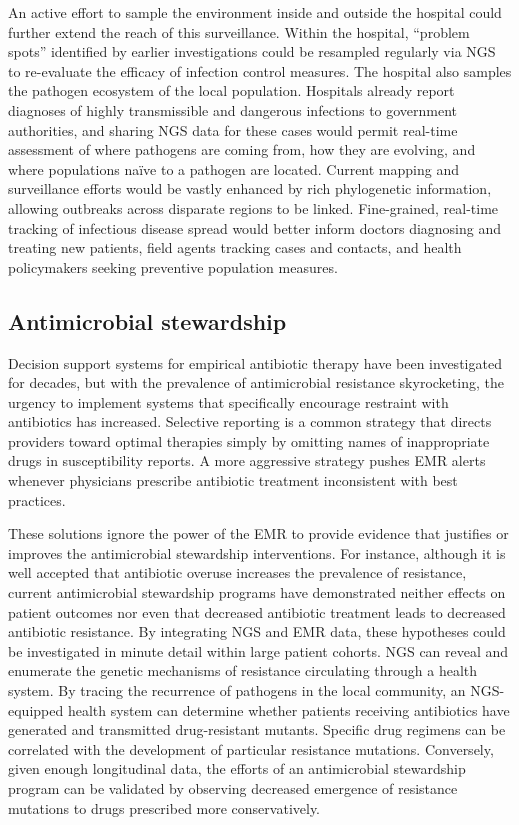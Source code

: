 An active effort to sample the environment inside and outside the hospital could further extend the reach of this surveillance. Within the hospital, “problem spots” identified by earlier investigations could be resampled regularly via NGS to re-evaluate the efficacy of infection control measures. The hospital also samples the pathogen ecosystem of the local population. Hospitals already report diagnoses of highly transmissible and dangerous infections to government authorities, and sharing NGS data for these cases would permit real-time assessment of where pathogens are coming from, how they are evolving, and where populations naïve to a pathogen are located. Current mapping and surveillance efforts \autocite{Brownstein2008} would be vastly enhanced by rich phylogenetic information, allowing outbreaks across disparate regions to be linked.\autocite{Chin2011,McAdam2012,Rasko2011} Fine-grained, real-time tracking of infectious disease spread would better inform doctors diagnosing and treating new patients, field agents tracking cases and contacts, and health policymakers seeking preventive population measures.

\subsection{Antimicrobial stewardship}

Decision support systems for empirical antibiotic therapy have been investigated for decades,\autocite{Leibovici1997} but with the prevalence of antimicrobial resistance skyrocketing, the urgency to implement systems that specifically encourage restraint with antibiotics has increased.\autocite{Wagner2014} Selective reporting is a common strategy that directs providers toward optimal therapies simply by omitting names of inappropriate drugs in susceptibility reports.\autocite{Doern2013} A more aggressive strategy pushes EMR alerts whenever physicians prescribe antibiotic treatment inconsistent with best practices.\autocite{Kullar2013}

These solutions ignore the power of the EMR to provide evidence that justifies or improves the antimicrobial stewardship interventions. For instance, although it is well accepted that antibiotic overuse increases the prevalence of resistance, current antimicrobial stewardship programs have demonstrated neither effects on patient outcomes nor even that decreased antibiotic treatment leads to decreased antibiotic resistance.\autocite{Wagner2014} By integrating NGS and EMR data, these hypotheses could be investigated in minute detail within large patient cohorts. NGS can reveal and enumerate the genetic mechanisms of resistance circulating through a health system. By tracing the recurrence of pathogens in the local community, an NGS-equipped health system can determine whether patients receiving antibiotics have generated and transmitted drug-resistant mutants. Specific drug regimens can be correlated with the development of particular resistance mutations. Conversely, given enough longitudinal data, the efforts of an antimicrobial stewardship program can be validated by observing decreased emergence of resistance mutations to drugs prescribed more conservatively.

